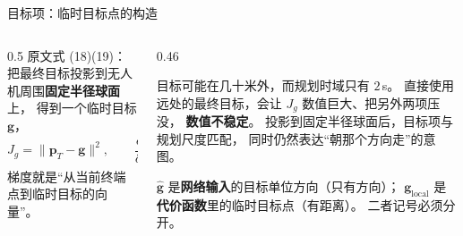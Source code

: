 \begin{frame}{目标项：临时目标点的构造}
  \small
  \begin{columns}[t]
    \begin{column}{0.5\textwidth}
      原文式 (18)(19)：把最终目标投影到无人机周围\textbf{固定半径球面}上，
      得到一个临时目标 $\mathbf g$，
      \[
        J_g=\lVert \mathbf p_T-\mathbf g\rVert^2,\qquad
        \frac{\partial J_g}{\partial\mathbf p_T}=2(\mathbf p_T-\mathbf g)
      \]
      梯度就是“从当前终端点到临时目标的向量”。
    \end{column}
    \begin{column}{0.46\textwidth}
      \begin{reading}[临时目标投影的作用]
        \small
        目标可能在几十米外，而规划时域只有 $2$\,s。
        直接使用远处的最终目标，会让 $J_g$ 数值巨大、把另外两项压没，
        \textbf{数值不稳定}。
        投影到固定半径球面后，目标项与规划尺度匹配，
        同时仍然表达“朝那个方向走”的意图。
      \end{reading}
      \begin{reading}[两个“目标”记号的区分]
        \scriptsize
        $\hat{\mathbf g}$ 是\textbf{网络输入}的目标单位方向（只有方向）；
        $\mathbf g_{\mathrm{local}}$ 是\textbf{代价函数}里的临时目标点（有距离）。
        二者记号必须分开。
      \end{reading}
    \end{column}
  \end{columns}
\end{frame}

